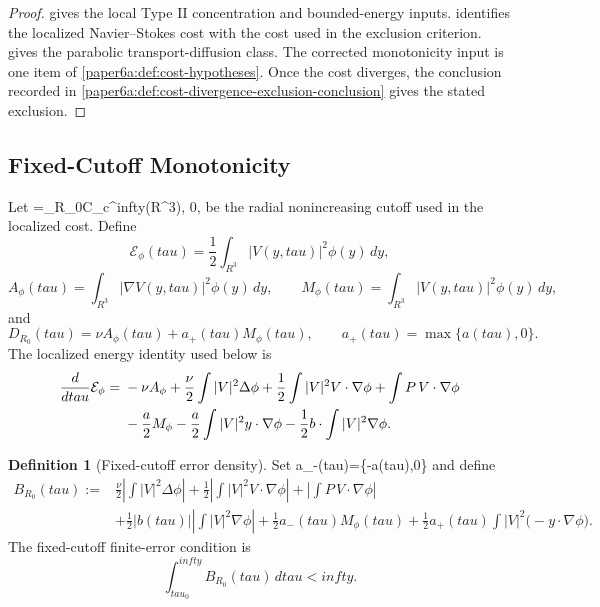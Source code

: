 \documentclass[11pt]{amsart}
\def\({}%
\def\){}%
\def\tilde#1{#1}%
\def\mathfrak#1{#1}%
\def\mathbb#1{#1}%
\def\tau{tau}%
\def\infty{infty}%
\theoremstyle{plain}
\theoremstyle{definition}
\newtheorem{definition}[definition]{Definition}
\theoremstyle{remark}
\begin{document}
\begin{proof}
 gives the local Type II concentration and
bounded-energy inputs.   identifies the
localized Navier--Stokes cost with the cost used in the exclusion criterion.
 gives the parabolic transport-diffusion class.
The corrected monotonicity input is one item of
\cref{paper6a:def:cost-hypotheses}.  Once the cost diverges,
the conclusion recorded in \cref{paper6a:def:cost-divergence-exclusion-conclusion} gives
the stated exclusion.
\end{proof}

\subsection{Fixed-Cutoff Monotonicity}

Let \(\phi=\phi_{R_0}\in C_c^\infty(\mathbb R^3)\), \(0\le\phi{}\), be the
radial nonincreasing cutoff used in the localized cost.  Define
\[
  \mathcal E_\phi(\tau)=\frac12\int_{\mathbb R^3}|V(y,\tau)|^2\phi(y)\,dy,
\]
\[
  A_\phi(\tau)=\int_{\mathbb R^3}|\nabla V(y,\tau)|^2\phi(y)\,dy,\qquad
  M_\phi(\tau)=\int_{\mathbb R^3}|V(y,\tau)|^2\phi(y)\,dy,
\]
and
\[
  \tilde{\mathfrak D}_{R_0}(\tau)=\nu A_\phi(\tau)+a_+(\tau)M_\phi(\tau),
  \qquad a_+(\tau)=\max\{a(\tau),0\}.
\]
The localized energy identity used below is
\begin{align}
  \frac{d}{d\tau}\mathcal E_\phi
  ={}&-\nu A_\phi
  +\frac{\nu}{2}\int |V|^2\Delta\phi
  +\frac12\int |V|^2V\cdot\nabla\phi
  +\int P\,V\cdot\nabla\phi \notag\\
  &-\frac{a}{2}M_\phi
  -\frac{a}{2}\int |V|^2y\cdot\nabla\phi
  -\frac12 b\cdot\int |V|^2\nabla\phi .
  \label{paper6a:eq:fixed-local-energy}
\end{align}

\begin{definition}[Fixed-cutoff error density]\label{paper6a:def:fixed-error-density}
Set \(a_-(\tau)=\max\{-a(\tau),0\}\) and define
\begin{align*}
  B_{R_0}(\tau)
  :={}&
  \frac{\nu}{2}\left|\int |V|^2\Delta\phi\right|
  +\frac12\left|\int |V|^2V\cdot\nabla\phi\right|
  +\left|\int P\,V\cdot\nabla\phi\right|\\
  &+\frac12|b(\tau)|\left|\int |V|^2\nabla\phi\right|
  +\frac12a_-(\tau)M_\phi(\tau)
  +\frac12a_+(\tau)\int |V|^2\bigl(-y\cdot\nabla\phi\bigr).
\end{align*}
The fixed-cutoff finite-error condition is
\[
  \int_{\tau_0}^{\infty}B_{R_0}(\tau)\,d\tau<\infty .
\]
\end{definition}
\end{document}
